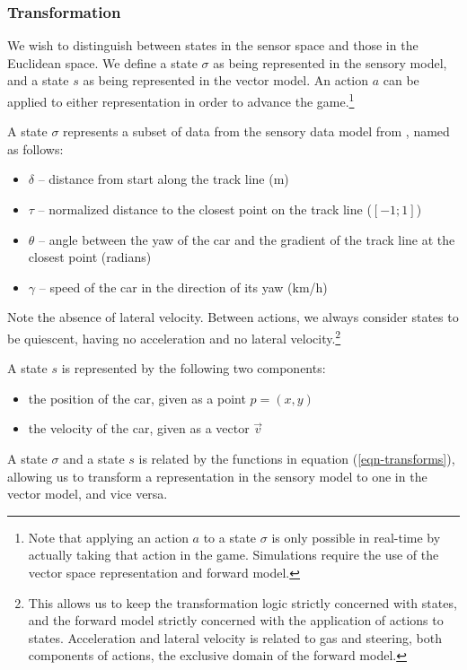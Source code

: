 \documentclass[conference]{IEEEtran}
\begin{document}
\subsubsection{Transformation}
\label{sec-trans}
We wish to distinguish between states in the sensor space and those in the Euclidean space. We define a state $\sigma$ as being represented in the sensory model, and a state $s$ as being represented in the vector model. An action $a$ can be applied to either representation in order to advance the game.\footnote{Note that applying an action $a$ to a state $\sigma$ is only possible in real-time by actually taking that action in the game. Simulations require the use of the vector space representation and forward model.}

A state $\sigma$ represents a subset of data from the sensory data model from \cite{manual}, named as follows:
\begin{itemize}
\item $\delta$ -- distance from start along the track line (m)
\item $\tau$ -- normalized distance to the closest point on the track line ($[-1;1]$)
\item $\theta$ -- angle between the yaw of the car and the gradient of the track line at the closest point (radians)
\item $\gamma$ -- speed of the car in the direction of its yaw (km/h)
\end{itemize}

Note the absence of lateral velocity. Between actions, we always consider states to be quiescent, having no acceleration and no lateral velocity.\footnote{This allows us to keep the transformation logic strictly concerned with states, and the forward model strictly concerned with the application of actions to states. Acceleration and lateral velocity is related to gas and steering, both components of actions, the exclusive domain of the forward model.}

A state $s$ is represented by the following two components:
\begin{itemize}
\item the position of the car, given as a point $p=(x,y)$
\item the velocity of the car, given as a vector $\vec{v}$
\end{itemize}

A state $\sigma$ and a state $s$ is related by the functions in equation (\ref{eqn-transforms}), allowing us to transform a representation in the sensory model to one in the vector model, and vice versa.
\end{document}
